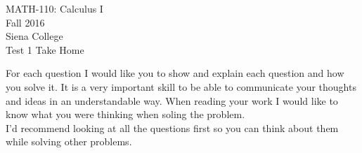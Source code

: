 \documentclass[11pt]{article}
\begin{document}
	\begin{center}
		MATH-110: Calculus I\\
		Fall 2016\\
		Siena College\\
		\vspace{.1in}
		Test 1 Take Home
	\end{center}
	\vspace{.1in}
	
	For each question I would like you to show and explain each question and how you solve it.  It is a very important skill to be able to communicate your thoughts and ideas in an understandable way. When reading your work I would like to know what you were thinking when soling the problem.\\
	
	I'd recommend looking at all the questions first so you can think about them while solving other problems.\\
	
\end{document}

